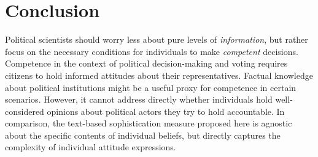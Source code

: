 \documentclass[12pt]{article}
\begin{document}




\section*{Conclusion}

Political scientists should worry less about pure levels of \textit{information}, but rather focus on the necessary conditions for individuals to make \textit{competent} decisions. Competence in the context of political decision-making and voting requires citizens to hold informed attitudes about their representatives. Factual knowledge about political institutions might be a useful proxy for competence in certain scenarios. However, it cannot address directly whether individuals hold well-considered opinions about political actors they try to hold accountable. In comparison, the text-based sophistication measure proposed here is agnostic about the specific contents of individual beliefs, but directly captures the complexity of individual attitude expressions.
\end{document}
